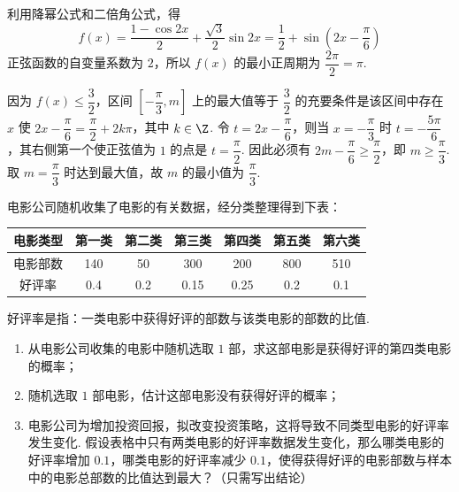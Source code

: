 \begin{solution}
利用降幂公式和二倍角公式，得
\[
f(x)=\frac{1-\cos2x}{2}+\frac{\sqrt3}{2}\sin2x=\frac12+\sin\left(2x-\frac\pi6\right)
\]
正弦函数的自变量系数为 \(2\)，所以 \(f(x)\) 的最小正周期为 \(\dfrac{2\pi}{2}=\pi\).

因为 \(f(x)\leq\dfrac32\)，区间 \(\left[-\dfrac\pi3,m\right]\) 上的最大值等于 \(\dfrac32\) 的充要条件是该区间中存在 \(x\) 使 \(2x-\dfrac\pi6=\dfrac\pi2+2k\pi\)，其中 \(k\in\Z\). 令 \(t=2x-\dfrac\pi6\)，则当 \(x=-\dfrac\pi3\) 时 \(t=-\dfrac{5\pi}{6}\)，其右侧第一个使正弦值为 \(1\) 的点是 \(t=\dfrac\pi2\). 因此必须有 \(2m-\dfrac\pi6\geq\dfrac\pi2\)，即 \(m\geq\dfrac\pi3\). 取 \(m=\dfrac\pi3\) 时达到最大值，故 \(m\) 的最小值为 \(\dfrac\pi3\).
\end{solution}


\begin{problem}

电影公司随机收集了电影的有关数据，经分类整理得到下表：

\begin{center}
\begin{tabular}{c|cccccc}
电影类型 & 第一类 & 第二类 & 第三类 & 第四类 & 第五类 & 第六类 \\
\hline
电影部数 & 140 & 50 & 300 & 200 & 800 & 510 \\
好评率 & 0.4 & 0.2 & 0.15 & 0.25 & 0.2 & 0.1
\end{tabular}
\end{center}

好评率是指：一类电影中获得好评的部数与该类电影的部数的比值.

\begin{enumerate}
\item 从电影公司收集的电影中随机选取 \(1\) 部，求这部电影是获得好评的第四类电影的概率；
\item 随机选取 \(1\) 部电影，估计这部电影没有获得好评的概率；
\item 电影公司为增加投资回报，拟改变投资策略，这将导致不同类型电影的好评率发生变化. 假设表格中只有两类电影的好评率数据发生变化，那么哪类电影的好评率增加 \(0.1\)，哪类电影的好评率减少 \(0.1\)，使得获得好评的电影部数与样本中的电影总部数的比值达到最大？（只需写出结论）
\end{enumerate}
\end{problem}

